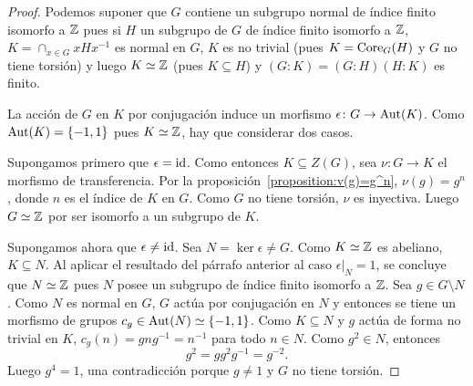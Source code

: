 \begin{proof}
	Podemos suponer que $G$ contiene un subgrupo normal de índice finito
	isomorfo a $\mathbb{Z}$ pues si $H$ un subgrupo de $G$ de índice finito isomorfo a
	$\mathbb{Z}$, $K=\cap_{x\in G}xHx^{-1}$ es normal en $G$, $K$ es no trivial (pues $K=\operatorname{Core}_G(H)$ y 
	$G$ no tiene torsión) y luego $K\simeq\mathbb{Z}$ (pues 
	$K\subseteq H$) y $(G:K)=(G:H)(H:K)$ es finito.

	La acción de $G$ en $K$ por conjugación induce un morfismo 
	$\epsilon\colon G\to\operatorname{Aut}(K)$. Como $\operatorname{Aut}(K)=\{-1,1\}$ pues $K\simeq\mathbb{Z}$, 
	hay que considerar dos casos. 
	
	Supongamos primero que $\epsilon=\operatorname{id}$. Como entonces $K\subseteq Z(G)$, sea
	$\nu\colon G\to K$ el morfismo de transferencia. Por la
	proposición~\ref{proposition:v(g)=g^n}, $\nu(g)=g^n$, donde $n$ es el
	índice de $K$ en $G$.  Como $G$ no tiene torsión, $\nu$ es inyectiva. Luego
	$G\simeq\mathbb{Z}$ por ser isomorfo a un subgrupo de $K$.

	Supongamos ahora que $\epsilon\ne\operatorname{id}$. Sea $N=\ker\epsilon\ne G$. Como
	$K\simeq\mathbb{Z}$ es abeliano, $K\subseteq N$. Al aplicar el resultado del
	párrafo anterior al caso $\epsilon|_N=1$, se concluye que $N\simeq\mathbb{Z}$ pues
	$N$ posee un subgrupo de índice finito isomorfo a $\mathbb{Z}$. Sea $g\in G\setminus N$. 
	Como $N$ es normal en $G$, $G$ actúa por conjugación en $N$ y entonces
	se tiene un morfismo de grupos $c_g\in\operatorname{Aut}(N)\simeq\{-1,1\}$. Como
	$K\subseteq N$ y $g$ actúa de forma no trivial en $K$, 
	$c_g(n)=gng^{-1}=n^{-1}$ para todo $n\in N$.  Como
	$g^2\in N$, entonces
	\[
		g^2=gg^2g^{-1}=g^{-2}.
	\]
	Luego $g^4=1$, una contradicción porque $g\ne1$ y $G$ no tiene torsión. 
\end{proof}


%
%
%
%	
%
%
%
